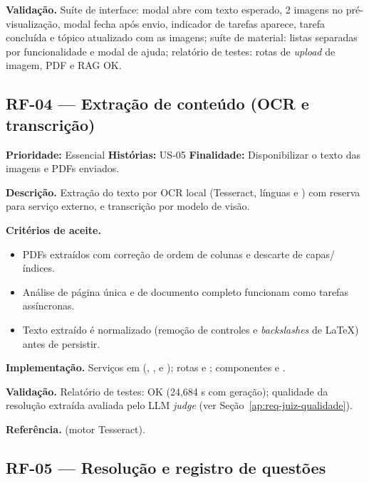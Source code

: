 \textbf{Validação.} Suíte de interface: modal abre com texto esperado, 2 imagens no pré-visualização, modal fecha após envio, indicador de tarefas aparece, tarefa concluída e tópico atualizado com as imagens; suíte de material: listas separadas por funcionalidade e modal de ajuda; relatório de testes: rotas de \emph{upload} de imagem, PDF e RAG OK.

\subsection{RF-04 --- Extração de conteúdo (OCR e transcrição)}

\textbf{Prioridade:} Essencial \quad \textbf{Histórias:} US-05 \quad \textbf{Finalidade:} Disponibilizar o texto das imagens e PDFs enviados.

\textbf{Descrição.} Extração do texto por OCR local (Tesseract, línguas \texttt{} e \texttt{}) com reserva para serviço externo, e transcrição por modelo de visão.

\textbf{Critérios de aceite.}
\begin{itemize}
    \item PDFs extraídos com correção de ordem de colunas e descarte de capas/índices.
    \item Análise de página única e de documento completo funcionam como tarefas assíncronas.
    \item Texto extraído é normalizado (remoção de controles e \emph{backslashes} de LaTeX) antes de persistir.
\end{itemize}

\textbf{Implementação.} Serviços em  (\texttt{}, \texttt{}, \texttt{} e \texttt{}); rotas \texttt{} e \texttt{}; componentes \texttt{} e \texttt{}.

\textbf{Validação.} Relatório de testes: \texttt{} OK (24,684 s com geração); qualidade da resolução extraída avaliada pelo LLM \emph{judge} (ver Seção~\ref{ap:req-juiz-qualidade}).

\textbf{Referência.} \cite{smith_2007} (motor Tesseract).

\subsection{RF-05 --- Resolução e registro de questões}

